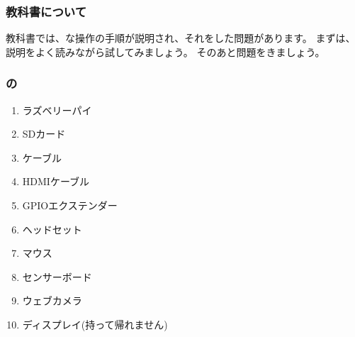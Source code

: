 \documentclass[text01.tex]{subfiles}
\begin{document}
% 
% 
\subsubsection{教科書について}

教科書では、な操作の手順が説明され、それをした問題があります。
まずは、説明をよく読みながら試してみましょう。
そのあと問題をきましょう。

% 
% 
\subsubsection{の}

\begin{minipage}[b]{0.45\linewidth}
  \begin{enumerate}
    \item ラズベリーパイ
    \item SDカード
    \item {}ケーブル
    \item HDMIケーブル
    \item GPIOエクステンダー
  \end{enumerate}  
\end{minipage}
%
\begin{minipage}[b]{0.45\linewidth}
  \begin{enumerate}
    \setcounter{enumi}{5}
    \item ヘッドセット
    \item マウス
    \item センサーボード
    \item ウェブカメラ
    \item ディスプレイ(持って帰れません)
  \end{enumerate}
\end{minipage}
\bigskip
\end{document}
